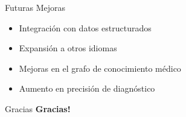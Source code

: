 \documentclass[10pt]{beamer}
\begin{document}
\begin{frame}{Futuras Mejoras}
    \begin{itemize}
        \item Integración con datos estructurados
        \item Expansión a otros idiomas
        \item Mejoras en el grafo de conocimiento médico
        \item Aumento en precisión de diagnóstico
    \end{itemize}
\end{frame}

\begin{frame}{Gracias}
    \centering
    \LARGE\textbf{Gracias!} \\
\end{frame}
\end{document}
